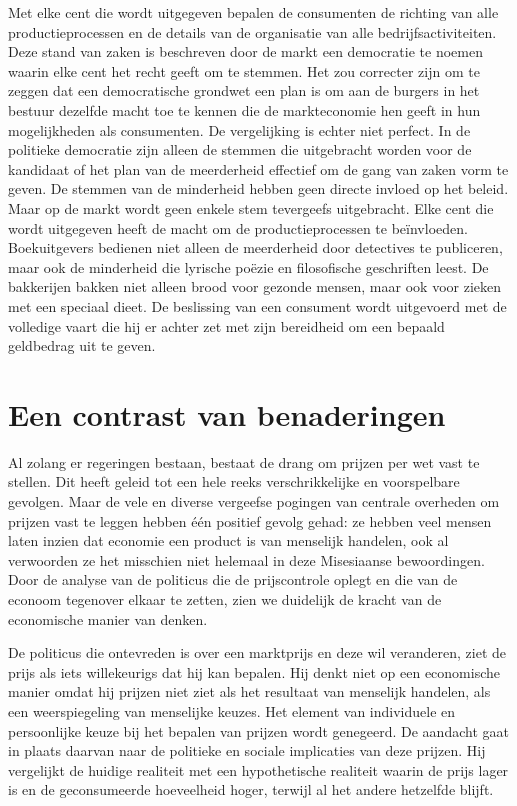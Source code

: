 \begin{blockquotebox}
    Met elke cent die wordt uitgegeven bepalen de consumenten de richting van alle productieprocessen en de details van de organisatie van alle bedrijfsactiviteiten. Deze stand van zaken is beschreven door de markt een democratie te noemen waarin elke cent het recht geeft om te stemmen. Het zou correcter zijn om te zeggen dat een democratische grondwet een plan is om aan de burgers in het bestuur dezelfde macht toe te kennen die de markteconomie hen geeft in hun mogelijkheden als consumenten. De vergelijking is echter niet perfect. In de politieke democratie zijn alleen de stemmen die uitgebracht worden voor de kandidaat of het plan van de meerderheid effectief om de gang van zaken vorm te geven. De stemmen van de minderheid hebben geen directe invloed op het beleid. Maar op de markt wordt geen enkele stem tevergeefs uitgebracht. Elke cent die wordt uitgegeven heeft de macht om de productieprocessen te beïnvloeden. Boekuitgevers bedienen niet alleen de meerderheid door detectives te publiceren, maar ook de minderheid die lyrische poëzie en filosofische geschriften leest. De bakkerijen bakken niet alleen brood voor gezonde mensen, maar ook voor zieken met een speciaal dieet. De beslissing van een consument wordt uitgevoerd met de volledige vaart die hij er achter zet met zijn bereidheid om een bepaald geldbedrag uit te geven.\footnotemark    
\end{blockquotebox}

\hypertarget{een-contrast-van-benaderingen}{%
\section{Een contrast van benaderingen}\label{een-contrast-van-benaderingen}}

Al zolang er regeringen bestaan, bestaat de drang om prijzen per wet vast te stellen. Dit heeft geleid tot een hele reeks verschrikkelijke en voorspelbare gevolgen.\autocite{129} Maar de vele en diverse vergeefse pogingen van centrale overheden om prijzen vast te leggen hebben één positief gevolg gehad: ze hebben veel mensen laten inzien dat economie een product is van menselijk handelen, ook al verwoorden ze het misschien niet helemaal in deze Misesiaanse bewoordingen. Door de analyse van de politicus die de prijscontrole oplegt en die van de econoom tegenover elkaar te zetten, zien we duidelijk de kracht van de economische manier van denken.

De politicus die ontevreden is over een marktprijs en deze wil veranderen, ziet de prijs als iets willekeurigs dat hij kan bepalen. Hij denkt niet op een economische manier omdat hij prijzen niet ziet als het resultaat van menselijk handelen, als een weerspiegeling van menselijke keuzes. Het element van individuele en persoonlijke keuze bij het bepalen van prijzen wordt genegeerd. De aandacht gaat in plaats daarvan naar de politieke en sociale implicaties van deze prijzen. Hij vergelijkt de huidige realiteit met een hypothetische realiteit waarin de prijs lager is en de geconsumeerde hoeveelheid hoger, terwijl al het andere hetzelfde blijft.

